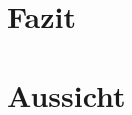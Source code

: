 \clearpage
\section{Fazit}


\clearpage
\section{Aussicht}



\nocite{GitHubGettingStartedHubot}
\nocite{BotkitBotkitToolkitbuilding}
\nocite{SlackConversationsAPI}

